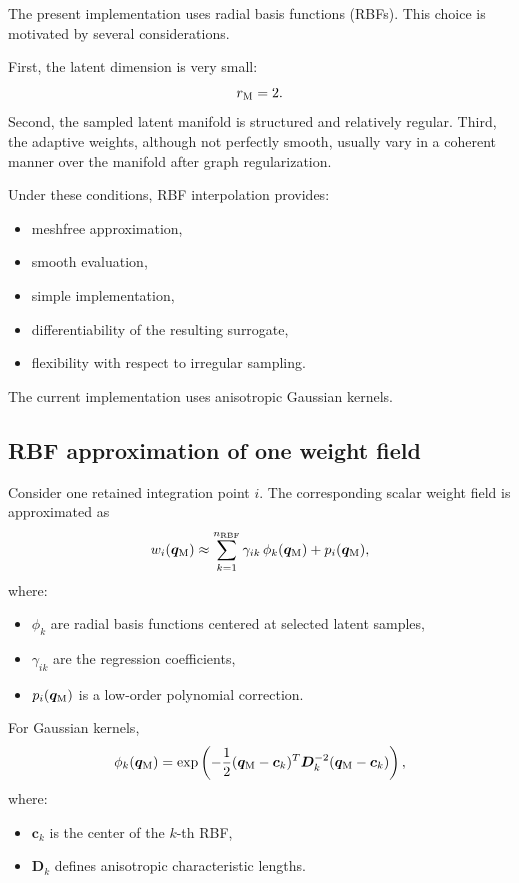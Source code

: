 \documentclass[11pt,a4paper]{article}
\begin{document}
The present implementation uses radial basis functions (RBFs). This choice is
motivated by several considerations.

First, the latent dimension is very small:
\[
        r_{\mathrm{M}}=2.
\]
Second, the sampled latent manifold is structured and relatively regular.
Third, the adaptive weights, although not perfectly smooth, usually vary in a
coherent manner over the manifold after graph regularization.

Under these conditions, RBF interpolation provides:
\begin{itemize}
    \item meshfree approximation,
    \item smooth evaluation,
    \item simple implementation,
    \item differentiability of the resulting surrogate,
    \item flexibility with respect to irregular sampling.
\end{itemize}

The current implementation uses anisotropic Gaussian kernels.

\subsection{RBF approximation of one weight field}

Consider one retained integration point $i$. The corresponding scalar weight
field is approximated as
\[
        w_i(\bm q_{\mathrm{M}})
        \approx
        \sum_{k=1}^{n_{\mathrm{RBF}}}
        \gamma_{ik}
        \,
        \phi_k(\bm q_{\mathrm{M}})
        +
        p_i(\bm q_{\mathrm{M}}),
        \label{eq:rbf_weight_approximation}
\]
where:
\begin{itemize}
    \item $\phi_k$ are radial basis functions centered at selected latent
    samples,
    \item $\gamma_{ik}$ are the regression coefficients,
    \item $p_i(\bm q_{\mathrm{M}})$ is a low-order polynomial correction.
\end{itemize}

For Gaussian kernels,
\[
        \phi_k(\bm q_{\mathrm{M}})
        =
        \exp
        \left(
        -\frac{1}{2}
        (\bm q_{\mathrm{M}}-\bm c_k)^T
        \bm D_k^{-2}
        (\bm q_{\mathrm{M}}-\bm c_k)
        \right),
        \label{eq:gaussian_rbf}
\]
where:
\begin{itemize}
    \item $\bm c_k$ is the center of the $k$-th RBF,
    \item $\bm D_k$ defines anisotropic characteristic lengths.
\end{itemize}
\end{document}
